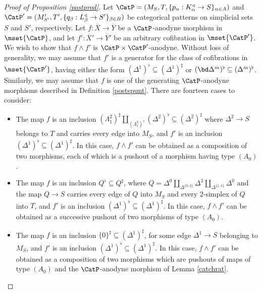 \begin{proof}[Proof of Proposition \ref{postprod}]
Let 
$\CatP = (M_S, T, \{ p_{\alpha}: K_{\alpha}^{\triangleleft} \rightarrow S\}_{\alpha \in A})$
and $\CatP' = (M'_{S'}, T', \{ q_{\beta}: L_{\beta}^{\triangleleft} \rightarrow S'\}_{\beta \in B})$
be categorical patterns on simplicial sets $S$ and $S'$, respectively.
Let $f: \overline{X} \rightarrow \overline{Y}$ be a $\CatP$-anodyne morphism
in $\mset{ \CatP}$, and let
$f': \overline{X}' \rightarrow \overline{Y}'$ be an arbitrary cofibration in $\mset{ \CatP'}$.
We wish to show that $f \wedge f'$ is $\CatP \times \CatP'$-anodyne. Without loss of generality,
we may assume that $f'$ is a generator for the class of cofibrations in $\mset{ \CatP'}$, having
either the form $(\Delta^1)^{\flat} \subseteq (\Delta^1)^{\sharp}$ or $(\bd \Delta^m)^{\flat} \subseteq (\Delta^m)^{\flat}$. Similarly, we may assume that $f$ is one of the generating
$\CatP$-anodyne morphisms described in Definition \ref{postspunt}. There
are fourteen cases to consider:
\begin{itemize}
\item[$(A_0)$] The map $f$ is an inclusion $( \Lambda^2_1)^{\sharp} \coprod_{ (\Lambda^2_{1})^{\flat}} (\Delta^2)^{\flat}  \subseteq (\Delta^2)^{\sharp}$ where $\Delta^2 \rightarrow S$ belongs to
$T$ and carries every edge into $M_S$, and $f'$ is an inclusion
$(\Delta^1)^{\flat} \subseteq (\Delta^1)^{\sharp}$. In this case, $f \wedge f'$ can be obtained as a composition of two morphisms, each of which is a pushout of a morphism having type $(A_0)$.

\item[$(A_1)$] The map $f$ is an inclusion $Q^{\flat} \subseteq Q^{\sharp}$, where
$Q = \Delta^0 \coprod_{ \Delta^{ \{0,2\} }} \Delta^3 \coprod_{ \Delta^{ \{1,3\} }} \Delta^0$
and the map $Q \rightarrow S$ carries every edge of $Q$ into $M_S$ and every $2$-simplex
of $Q$ into $T$, and $f'$ is an inclusion $(\Delta^1)^{\flat} \subseteq (\Delta^1)^{\sharp}$.
In this case, $f \wedge f'$ can be obtained as a successive pushout of two morphisms
of type $(A_0)$.

\item[$(B_0)$] The map $f$ is an inclusion $\{0\}^{\sharp} \subseteq (\Delta^1)^{\sharp}$, for some
edge $\Delta^1 \rightarrow S$ belonging to $M_S$, and $f'$ is an inclusion
$(\Delta^1)^{\flat} \subseteq (\Delta^1)^{\sharp}$. In this case, $f \wedge f'$ can be obtained
as a composition of two morphisms which are pushouts of maps of type $(A_0)$ and
the $\CatP$-anodyne morphism of Lemma \ref{catchrat}.


\end{itemize}
\end{proof}
